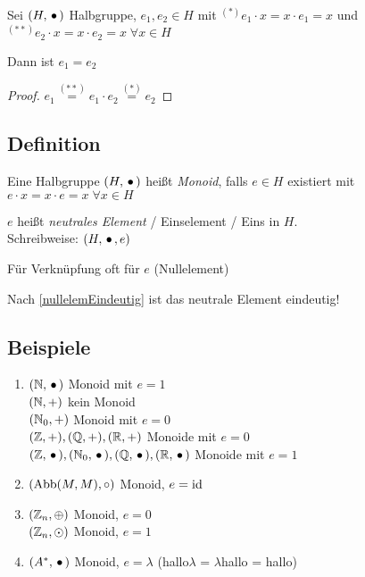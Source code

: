  Sei $(H, \,{\bullet}\,)$ Halbgruppe, $e_1, e_2 \in H$ mit 
 $^{(*)} e_1 \cdot x = x \cdot e_1 = x$ und $^{(**)} e_2 \cdot x = x \cdot e_2 = x \; \forall x \in H$

 Dann ist $e_1 = e_2$
 
 \begin{proof}
 $e_1 \stackrel{(**)}{=} e_1 \cdot e_2 \stackrel{(*)}{=} e_2$
 \end{proof} 
 
 
 \subsection[Definition: Monoid]{Definition}
 
 Eine Halbgruppe $(H, \,{\bullet}\,)$ heißt \emph{Monoid}, falls $e \in H$ existiert mit $e\cdot x = x \cdot e = x \; \forall x \in H$
 
 $e$ heißt \emph{neutrales Element} / Einselement / Eins in $H$.
 \\Schreibweise: $(H, \,{\bullet}\,, e)$
 
 Für  Verknüpfung oft  für $e$ (Nullelement)
 
 Nach \ref{nullelemEindeutig} ist das neutrale Element eindeutig!
 
 \subsection{Beispiele}
 
 \begin{enumerate}

	\item
	$(\mathbb{N}, \,{\bullet}\,)$ Monoid mit $e=1$
	\\$(\mathbb{N}, +)$ kein Monoid
	\\$(\mathbb{N}_0, +)$ Monoid mit $e=0$
	\\$(\mathbb{Z}, +), (\mathbb{Q}, +), (\mathbb{R}, +)$ Monoide mit $e=0$
	\\$(\mathbb{Z}, \,{\bullet}\,), (\mathbb{N}_0, \,{\bullet}\,), (\mathbb{Q}, \,{\bullet}\,), (\mathbb{R}, \,{\bullet}\,)$ Monoide mit $e=1$
	
	\item
	$(\mathrm{ Abb }(M, M), \circ)$ Monoid, $e = \mathrm{ id }$
	
	\item
	$(\mathbb{Z}_n, \oplus)$ Monoid, $e=0$
	\\ $(\mathbb{Z}_n, \odot)$ Monoid, $e=1$
	
	\item
	$(A^*, \,{\bullet}\,)$ Monoid, $e= \lambda$ (hallo$\lambda$ = $\lambda$hallo = hallo)

 \end{enumerate}
 
